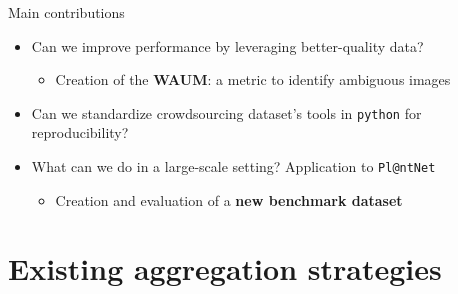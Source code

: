 \begin{frame}{Main contributions}{}

    \begin{itemize}
        \item<1-> Can we improve performance by leveraging better-quality data?
        \begin{itemize}
            \item<4-> Creation of the \textbf{WAUM}: a metric to identify ambiguous images %
        \end{itemize}
        \vspace{10pt} %
        \item<2-> Can we standardize crowdsourcing dataset's tools in \texttt{python} for reproducibility?
        \vspace{10pt}
        \item<3-> What can we do in a large-scale setting? Application to \texttt{Pl@ntNet}
        \begin{itemize}
            \item<6-> Creation and evaluation of a \textbf{new benchmark dataset}
        \end{itemize}
    \end{itemize}

\end{frame}

\section{Existing aggregation strategies}


